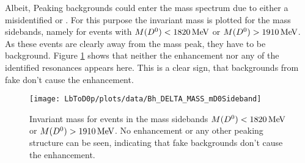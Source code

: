 Albeit, Peaking backgrounds could enter the \Dz\proton mass spectrum due to either a misidentified \Dz or \proton.
For this purpose the invariant \Dz\proton mass is plotted for the \Dz mass sidebands, namely for events with $M({{D}^0}) < 1820 \mathrm{\,Me\kern -0.1em V}$ or $M({{D}^0}) > 1910 \mathrm{\,Me\kern -0.1em V}$.
As these events are clearly away from the \Dz mass peak, they have to be background.
Figure \ref{fig:plot_mD0p_mD0Sideband} shows that neither the enhancement nor any of the identified \Lc resonances appears here.
This is a clear sign, that backgrounds from fake \Dz don't cause the enhancement.
\begin{figure}[hptb]
	\centering
	\texttt{[image: LbToD0p/plots/data/Bh\_DELTA\_MASS\_mD0Sideband]}
	\caption{Invariant \Dz\proton mass for events in the \Dz mass sidebands $M({{D}^0}) < 1820 \mathrm{\,Me\kern -0.1em V}$ or $M({{D}^0}) > 1910 \mathrm{\,Me\kern -0.1em V}$. No enhancement or any other peaking structure can be seen, indicating that fake \Dz backgrounds don't cause the enhancement.}
	\label{fig:plot_mD0p_mD0Sideband}
\end{figure}


